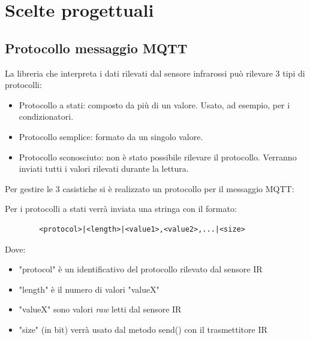 \documentclass[a4paper,11pt]{article}
\begin{document}
\section{Scelte progettuali}

    \subsection{Protocollo messaggio MQTT}

    La libreria che interpreta i dati rilevati dal sensore infrarossi può rilevare 3 tipi di protocolli:
    \begin{itemize}
      \item Protocollo a stati: composto da più di un valore. Usato, ad esempio, per i condizionatori.
      \item Protocollo semplice: formato da un singolo valore.
      \item Protocollo sconosciuto: non è stato possibile rilevare il protocollo. Verranno inviati tutti i valori rilevati durante la lettura.
    \end{itemize}

    \noindent
    Per gestire le 3 casistiche si è realizzato un protocollo per il messaggio MQTT:
    \smallskip

    \begin{samepage}
      Per i protocolli a stati verrà inviata una stringa con il formato:

      \begin{verbatim}
        <protocol>|<length>|<value1>,<value2>,...|<size>
      \end{verbatim}
              
      Dove:
      \begin{itemize}
        \item "protocol" è un identificativo del protocollo rilevato dal sensore IR
        \item "length" è il numero di valori "valueX"
        \item "valueX" sono valori \emph{raw} letti dal sensore IR
        \item "size" (in bit) verrà usato dal metodo send() con il trasmettitore IR
      \end{itemize}
    \end{samepage}

    \bigskip
\end{document}
